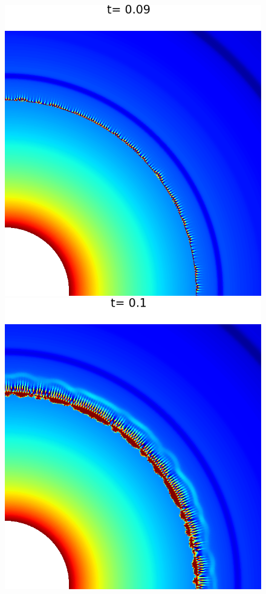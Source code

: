 \documentclass[preprint, 11pt]{article}
\begin{document}
\begin{figure}[!h]
  \centering 
  \includegraphics[scale=0.28]{figures/chj_r2_roe_p1.png} \quad
  \includegraphics[scale=0.28]{figures/chj_r2_roe_p2.png} \quad

\end{figure}
\end{document}
